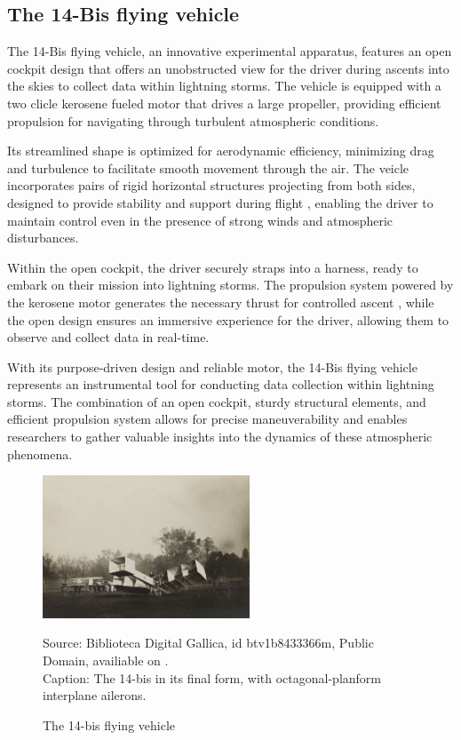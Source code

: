 \documentclass[portuguese]{cenarticle}
\begin{document}
\subsection{The 14-Bis flying vehicle}
The 14-Bis flying vehicle, an innovative experimental apparatus, features an open cockpit design that offers an unobstructed view for the driver during ascents into the skies to collect data within lightning storms. The vehicle is equipped with a two clicle kerosene fueled motor \citep{Torrens1992} that drives a large propeller, providing efficient propulsion for navigating through turbulent atmospheric conditions.\par
%
Its streamlined shape is optimized for aerodynamic efficiency, minimizing drag and turbulence to facilitate smooth movement through the air. The veicle incorporates pairs of rigid horizontal structures projecting from both sides, designed to provide stability and support during flight \citep{Wipo}, enabling the driver to maintain control even in the presence of strong winds and atmospheric disturbances.\par
%
Within the open cockpit, the driver securely straps into a harness, ready to embark on their mission into lightning storms. The propulsion system powered by the kerosene motor generates the necessary thrust for controlled ascent \citep{Torrens1992}, while the open design ensures an immersive experience for the driver, allowing them to observe and collect data in real-time.\par
%
With its purpose-driven design and reliable motor, the 14-Bis flying vehicle represents an instrumental tool for conducting data collection within lightning storms. The combination of an open cockpit, sturdy structural elements, and efficient propulsion system allows for precise maneuverability and enables researchers to gather valuable insights into the dynamics of these atmospheric phenomena.
%
\begin{figure}[!h]
  \caption{The 14-bis flying vehicle}
  \vspace{-3mm} 
  \begin{center}
    \includegraphics[width=0.55\textwidth, trim={0 0 0 0},clip]{images/14-bis.jpeg}
  \end{center}
  {\footnotesize
  Source: Biblioteca Digital Gallica, id btv1b8433366m, Public Domain, availiable on \citep{Beau1907}.\\
  Caption: The 14-bis in its final form, with octagonal-planform interplane ailerons.}
    \label{fig:triangle2}
  \end{figure}
\end{document}
